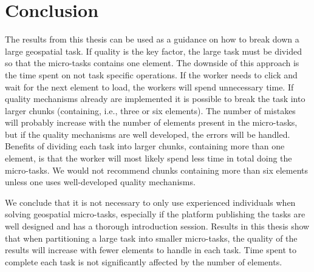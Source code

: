 \chapter{Conclusion}
The results from this thesis can be used as a guidance on how to break down a large geospatial task. If quality is the key factor, the large task must be divided so that the micro-tasks contains one element. The downside of this approach is the time spent on not task specific operations. If the worker needs to click and wait for the next element to load, the workers will spend unnecessary time. If quality mechanisms already are implemented it is possible to break the task into larger chunks (containing, i.e., three or six elements). The number of mistakes will probably increase with the number of elements present in the micro-tasks, but if the quality mechanisms are well developed, the errors will be handled. Benefits of dividing each task into larger chunks, containing more than one element, is that the worker will most likely spend less time in total doing the micro-tasks. We would not recommend chunks containing more than six elements unless one uses well-developed quality mechanisms. 

We conclude that it is not necessary to only use experienced individuals when solving geospatial micro-tasks, especially if the platform publishing the tasks are well designed and has a thorough introduction session. 
Results in this thesis show that when partitioning a large task into smaller micro-tasks, the quality of the results will increase with fewer elements to handle in each task. Time spent to complete each task is not significantly affected by the number of elements.
